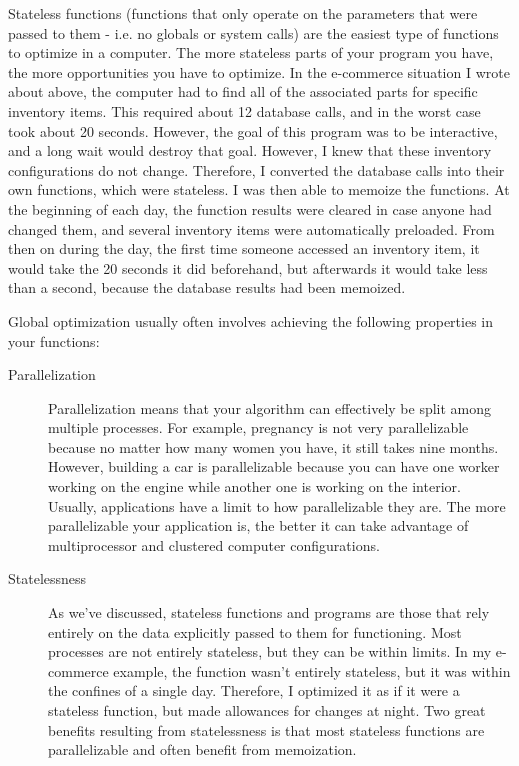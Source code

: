 Stateless functions (functions that only operate on the parameters that
were passed to them - i.e. no globals or system calls) are the easiest 
type of functions to optimize in a computer.  The more stateless parts of 
your program you have, the more opportunities you have to optimize.  In the
e-commerce situation I wrote about above, the computer had to find all of 
the associated parts for specific inventory items.  This required about 12
database calls, and in the worst case took about 20 seconds.  However, the goal
of this program was to be interactive, and a long wait
would destroy that goal.  However, I knew that these inventory
configurations do not change.  Therefore, I converted the 
database calls into their own functions, which were stateless.
I was then able to memoize the functions.  At the beginning of
each day, the function results were cleared in case anyone had
changed them, and several inventory items were automatically
preloaded.  From then on during the day, the first time someone
accessed an inventory item, it would take the 20 seconds it
did beforehand, but afterwards it would take less than a second,
because the database results had been memoized.

Global optimization usually often involves achieving the following 
properties in your functions:

\begin{description}
\item[Parallelization] Parallelization means that your algorithm
can effectively be split among multiple processes.  For example, 
pregnancy is not very parallelizable because no matter how many women
you have, it still takes nine months.  However, building a car is
parallelizable because you can have one worker working on the engine
while another one is working on the interior.  Usually, applications
have a limit to how parallelizable they are.  The more parallelizable
your application is, the better it can take advantage of multiprocessor
and clustered computer configurations.
\item[Statelessness] As we've discussed, stateless functions and programs are those that rely 
entirely on the data explicitly passed to them for functioning.  
Most processes are not entirely stateless, but they can be within
limits.  In my e-commerce example, the function wasn't entirely stateless,
but it was within the confines of a single day.  Therefore, I optimized it
as if it were a stateless function, but made allowances for changes at night.
Two great benefits resulting from statelessness is that most stateless 
functions are parallelizable and often benefit from memoization.
\end{description}

